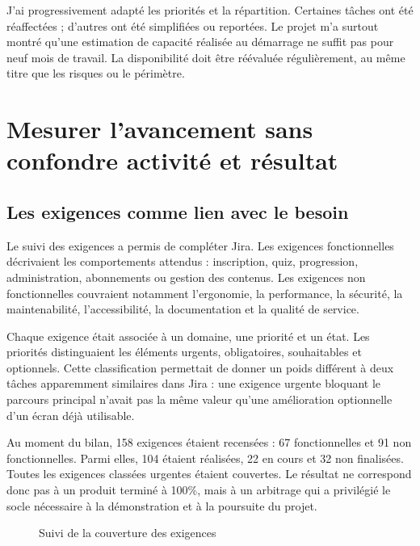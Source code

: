 J'ai progressivement adapté les priorités et la répartition. Certaines tâches ont été réaffectées ; d'autres ont été simplifiées ou reportées. Le projet m'a surtout montré qu'une estimation de capacité réalisée au démarrage ne suffit pas pour neuf mois de travail. La disponibilité doit être réévaluée régulièrement, au même titre que les risques ou le périmètre.

\section{Mesurer l'avancement sans confondre activité et résultat}

\subsection{Les exigences comme lien avec le besoin}

Le suivi des exigences a permis de compléter Jira. Les exigences fonctionnelles décrivaient les comportements attendus : inscription, quiz, progression, administration, abonnements ou gestion des contenus. Les exigences non fonctionnelles couvraient notamment l'ergonomie, la performance, la sécurité, la maintenabilité, l'accessibilité, la documentation et la qualité de service.

Chaque exigence était associée à un domaine, une priorité et un état. Les priorités distinguaient les éléments urgents, obligatoires, souhaitables et optionnels. Cette classification permettait de donner un poids différent à deux tâches apparemment similaires dans Jira : une exigence urgente bloquant le parcours principal n'avait pas la même valeur qu'une amélioration optionnelle d'un écran déjà utilisable.

Au moment du bilan, 158 exigences étaient recensées : 67 fonctionnelles et 91 non fonctionnelles. Parmi elles, 104 étaient réalisées, 22 en cours et 32 non finalisées. Toutes les exigences classées urgentes étaient couvertes. Le résultat ne correspond donc pas à un produit terminé à 100\%, mais à un arbitrage qui a privilégié le socle nécessaire à la démonstration et à la poursuite du projet.

\begin{figure}[H]
\centering
{}
\caption{Suivi de la couverture des exigences}
\label{fig:lynx-exigences}
\end{figure}

